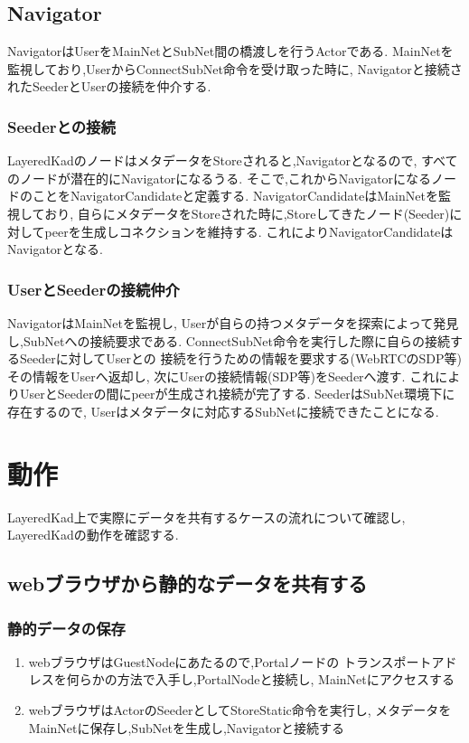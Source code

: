 \documentclass[sotsuron]{jcsie}
\begin{document}
\subsection{Navigator}
NavigatorはUserをMainNetとSubNet間の橋渡しを行うActorである.
MainNetを監視しており,UserからConnectSubNet命令を受け取った時に,
Navigatorと接続されたSeederとUserの接続を仲介する.

\subsubsection{Seederとの接続}
LayeredKadのノードはメタデータをStoreされると,Navigatorとなるので,
すべてのノードが潜在的にNavigatorになるうる.
そこで,これからNavigatorになるノードのことをNavigatorCandidateと定義する.
NavigatorCandidateはMainNetを監視しており,
自らにメタデータをStoreされた時に,Storeしてきたノード(Seeder)に
対してpeerを生成しコネクションを維持する.
これによりNavigatorCandidateはNavigatorとなる.

\subsubsection{UserとSeederの接続仲介}
NavigatorはMainNetを監視し,
Userが自らの持つメタデータを探索によって発見し,SubNetへの接続要求である.
ConnectSubNet命令を実行した際に自らの接続するSeederに対してUserとの
接続を行うための情報を要求する(WebRTCのSDP等)その情報をUserへ返却し,
次にUserの接続情報(SDP等)をSeederへ渡す.
これによりUserとSeederの間にpeerが生成され接続が完了する.
SeederはSubNet環境下に存在するので,
Userはメタデータに対応するSubNetに接続できたことになる.

\section{動作}
LayeredKad上で実際にデータを共有するケースの流れについて確認し,
LayeredKadの動作を確認する.

\subsection{webブラウザから静的なデータを共有する}
\subsubsection{静的データの保存}
\begin{enumerate}
	\item 
	webブラウザはGuestNodeにあたるので,Portalノードの
	トランスポートアドレスを何らかの方法で入手し,PortalNodeと接続し,
	MainNetにアクセスする
	\\
	\item
	webブラウザはActorのSeederとしてStoreStatic命令を実行し,
	メタデータをMainNetに保存し,SubNetを生成し,Navigatorと接続する	
\end{enumerate}
\end{document}

